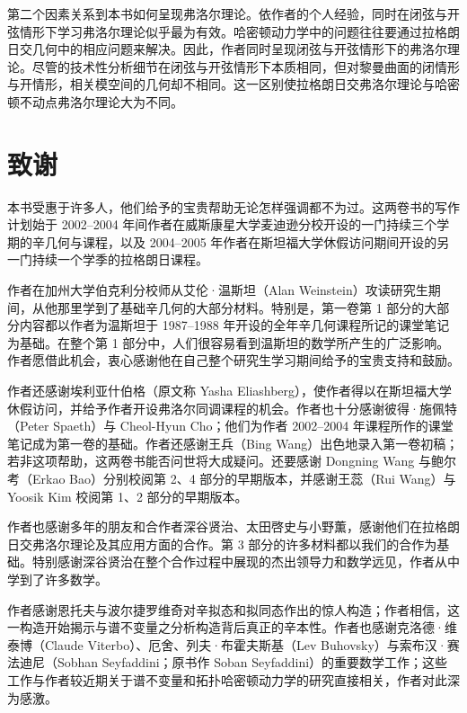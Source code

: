 第二个因素关系到本书如何呈现弗洛尔理论。依作者的个人经验，同时在闭弦与开弦情形下学习弗洛尔理论似乎最为有效。哈密顿动力学中的问题往往要通过拉格朗日交几何中的相应问题来解决。因此，作者同时呈现闭弦与开弦情形下的弗洛尔理论。尽管\termPseudoholomorphicCurve{}的技术性分析细节在闭弦与开弦情形下本质相同，但对黎曼曲面的闭情形与开情形，相关\termPseudoholomorphicCurve{}模空间的几何却不相同。这一区别使拉格朗日交弗洛尔理论与哈密顿不动点弗洛尔理论大为不同。

\section*{致谢}

本书受惠于许多人，他们给予的宝贵帮助无论怎样强调都不为过。这两卷书的写作计划始于 2002--2004 年间作者在威斯康星大学麦迪逊分校开设的一门持续三个学期的辛几何与\termPseudoholomorphicCurve{}课程，以及 2004--2005 年作者在斯坦福大学休假访问期间开设的另一门持续一个学季的拉格朗日\termFloerHomology{}课程。

作者在加州大学伯克利分校师从艾伦·温斯坦（Alan Weinstein）攻读研究生期间，从他那里学到了基础辛几何的大部分材料。特别是，第一卷第 1 部分的大部分内容都以作者为温斯坦于 1987--1988 年开设的全年辛几何课程所记的课堂笔记为基础。在整个第 1 部分中，人们很容易看到温斯坦的数学所产生的广泛影响。作者愿借此机会，衷心感谢他在自己整个研究生学习期间给予的宝贵支持和鼓励。

作者还感谢埃利亚什伯格（原文称 Yasha Eliashberg），使作者得以在斯坦福大学休假访问，并给予作者开设弗洛尔同调课程的机会。作者也十分感谢彼得·施佩特（Peter Spaeth）与 Cheol-Hyun Cho；他们为作者 2002--2004 年课程所作的课堂笔记成为第一卷的基础。作者还感谢王兵（Bing Wang）出色地录入第一卷初稿；若非这项帮助，这两卷书能否问世将大成疑问。还要感谢 Dongning Wang 与鲍尔考（Erkao Bao）分别校阅第 2、4 部分的早期版本，并感谢王蕊（Rui Wang）与 Yoosik Kim 校阅第 1、2 部分的早期版本。

作者也感谢多年的朋友和合作者深谷贤治、太田啓史与小野薫，感谢他们在拉格朗日交弗洛尔理论及其应用方面的合作。第 3 部分的许多材料都以我们的合作为基础。特别感谢深谷贤治在整个合作过程中展现的杰出领导力和数学远见，作者从中学到了许多数学。

作者感谢恩托夫与波尔捷罗维奇对辛拟态和拟同态作出的惊人构造；作者相信，这一构造开始揭示\termFloerHomology{}与谱不变量之分析构造背后真正的辛本性。作者也感谢克洛德·维泰博（Claude Viterbo）、厄舍、列夫·布霍夫斯基（Lev Buhovsky）与索布汉·赛法迪尼（Sobhan Seyfaddini；原书作 Soban Seyfaddini）的重要数学工作；这些工作与作者较近期关于谱不变量和拓扑哈密顿动力学的研究直接相关，作者对此深为感激。

